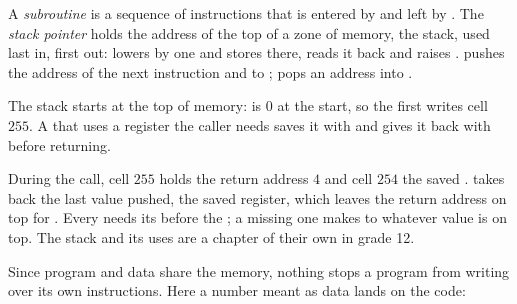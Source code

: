 \begin{definition}\label{def:g11:von-neumann-machine:subroutine}
A \emph{subroutine} is a sequence of instructions that is entered by  and left by
. The \emph{stack pointer}  holds the address of the top of a zone of memory,
the stack, used last in, first out:  lowers  by one and stores  there, 
reads it back and raises .  pushes the address of the next instruction and  to ;
 pops an address into .
\end{definition}

The stack starts at the top of memory:  is $0$ at the start, so the first  writes cell $255$.
A  that uses a register the caller needs saves it with  and gives it back with 
before returning.

\label{lst:g11:von-neumann-machine:call-square}

\label{out:g11:von-neumann-machine:call-square}

During the call, cell $255$ holds the return address $4$ and cell $254$ the saved .  takes back
the last value pushed, the saved register, which leaves the return address on top for . Every
 needs its  before the ; a missing one makes   to whatever value is on
top. The stack and its uses are a chapter of their own in grade 12.

Since program and data share the memory, nothing stops a program from writing over its own instructions. Here a
number meant as data lands on the code:

\label{lst:g11:von-neumann-machine:self-modify}

\label{out:g11:von-neumann-machine:self-modify}

